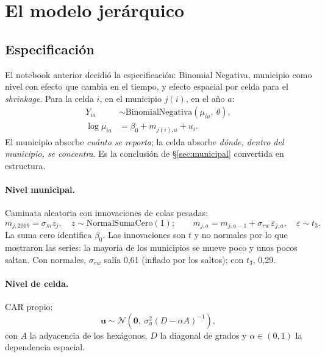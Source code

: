 \documentclass[11pt,a4paper]{article}
\newcommand{\NB}{\mathrm{BinomialNegativa}}
\begin{document}
\section{El modelo jerárquico}

\subsection{Especificación}

El notebook anterior decidió la especificación: Binomial Negativa, municipio
como nivel con efecto que cambia en el tiempo, y efecto espacial por celda
para el \emph{shrinkage}. Para la celda $i$, en el municipio $j(i)$, en el año $a$:
\begin{align}
Y_{ia} &\sim \NB(\mu_{ia},\ \theta), \\
\log \mu_{ia} &= \beta_0 + m_{j(i),a} + u_i .
\end{align}
El municipio absorbe \emph{cuánto se reporta}; la celda absorbe \emph{dónde,
dentro del municipio, se concentra}. Es la conclusión de
§\ref{sec:municipal} convertida en estructura.

\paragraph{Nivel municipal.} Caminata aleatoria con innovaciones de colas
pesadas:
\begin{equation}
m_{j,2019} = \sigma_m z_j,\quad z \sim \text{NormalSumaCero}(1); \qquad
m_{j,a} = m_{j,a-1} + \sigma_{rw}\,\varepsilon_{j,a},\quad \varepsilon \sim t_3 .
\end{equation}
La suma cero identifica $\beta_0$. Las innovaciones son $t$ y no normales por
lo que mostraron las series: la mayoría de los municipios se mueve poco y unos
pocos saltan. Con normales, $\sigma_{rw}$ salía 0,61 (inflado por los saltos);
con $t_3$, 0,29.

\paragraph{Nivel de celda.} CAR propio:
\begin{equation}
\mathbf{u} \sim \mathcal{N}\!\left(\mathbf{0},\ \sigma_u^2 (D - \alpha A)^{-1}\right),
\end{equation}
con $A$ la adyacencia de los hexágonos, $D$ la diagonal de grados y
$\alpha \in (0,1)$ la dependencia espacial.
\end{document}
